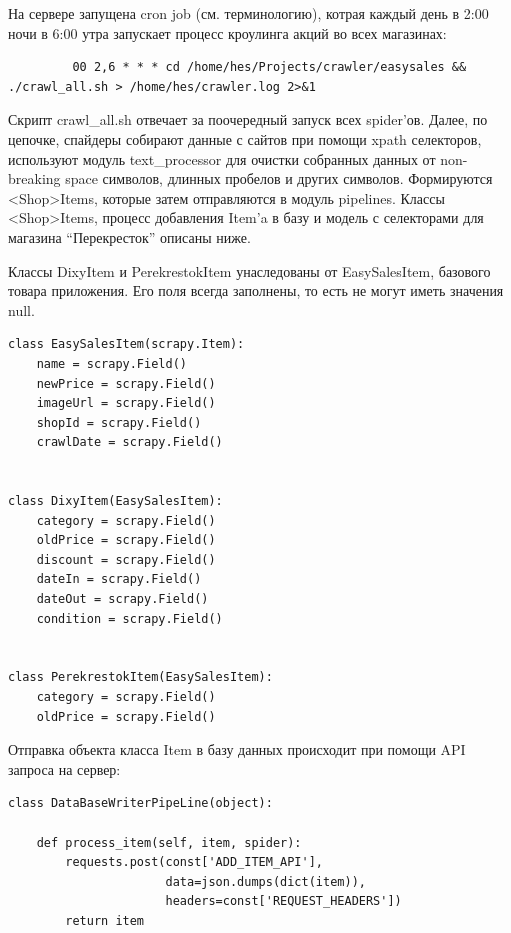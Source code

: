 На сервере запущена cron job (см. терминологию), котрая каждый день в 2:00 ночи в 6:00 утра запускает процесс кроулинга акций во всех магазинах:

\begin{small}
    \begin{verbatim}
         00 2,6 * * * cd /home/hes/Projects/crawler/easysales && ./crawl_all.sh > /home/hes/crawler.log 2>&1
    \end{verbatim}
\end{small}

Скрипт crawl\_all.sh отвечает за поочередный запуск всех spider'ов. Далее, по
цепочке, спайдеры собирают данные с сайтов при помощи xpath селекторов,
используют модуль text\_processor для очистки собранных данных от non-breaking
space символов, длинных пробелов и других символов. Формируются <Shop>Items,
которые затем отправляются в модуль pipelines. Классы <Shop>Items, процесс
добавления Item'a в базу и модель с селекторами для магазина ``Перекресток''
описаны ниже.

Классы DixyItem и PerekrestokItem унаследованы от EasySalesItem, базового
товара приложения. Его поля всегда заполнены, то есть не могут иметь значения
null.

\begin{small}
    \begin{verbatim}
class EasySalesItem(scrapy.Item):
    name = scrapy.Field()
    newPrice = scrapy.Field()
    imageUrl = scrapy.Field()
    shopId = scrapy.Field()
    crawlDate = scrapy.Field()


class DixyItem(EasySalesItem):
    category = scrapy.Field()
    oldPrice = scrapy.Field()
    discount = scrapy.Field()
    dateIn = scrapy.Field()
    dateOut = scrapy.Field()
    condition = scrapy.Field()


class PerekrestokItem(EasySalesItem):
    category = scrapy.Field()
    oldPrice = scrapy.Field()
    \end{verbatim}
\end{small}

Отправка объекта класса Item в базу данных происходит при помощи API запроса на
сервер:


\begin{small}
    \begin{verbatim}
class DataBaseWriterPipeLine(object):

    def process_item(self, item, spider):
        requests.post(const['ADD_ITEM_API'],
                      data=json.dumps(dict(item)),
                      headers=const['REQUEST_HEADERS'])
        return item
    \end{verbatim}
\end{small}


